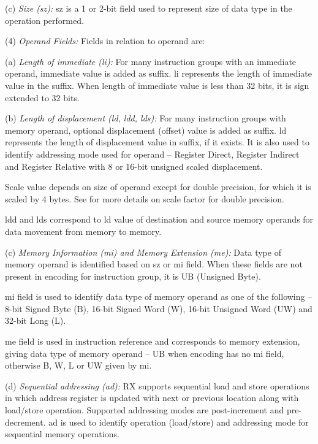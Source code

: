     (c) \emph{Size (sz):} %
    sz is a 1 or 2-bit field used to represent size of data type in the operation performed. 

\levelone    
(4) \emph{Operand Fields:} %
Fields in relation to operand are:

    \leveltwo
    (a) \emph{Length of immediate (li):} %
    For many instruction groups with an immediate operand, immediate value is added as suffix. li 
    represents the length of immediate value in the suffix. When length of immediate value is less 
    than 32 bits, it is sign extended to 32 bits.

    (b) \emph{Length of displacement (ld, ldd, lds):} %
    For many instruction groups with memory operand, optional displacement (offset) value is added as 
    suffix. ld represents the length of displacement value in suffix, if it exists. It is also used 
    to identify addressing mode used for operand -- Register Direct, Register Indirect and Register
    Relative with 8 or 16-bit unsigned scaled displacement. 
    
    Scale value depends on size of operand except for double precision, for which it is scaled by 
    4 bytes. See  for more details on scale 
    factor for double precision.

    ldd and lds correspond to ld value of destination and source memory operands for data movement 
    from memory to memory.

    (c) \emph{Memory Information (mi) and Memory Extension (me):} %
    Data type of memory operand is identified based on sz or mi field. When these fields are not 
    present in encoding for instruction group, it is UB (Unsigned Byte).

    mi field is used to identify data type of memory operand as one of the following -- 8-bit 
    Signed Byte (B), 16-bit Signed Word (W), 16-bit Unsigned Word (UW) and 32-bit Long (L).

    me field is used in instruction reference and corresponds to memory extension, giving data 
    type of memory operand -- UB when encoding has no mi field, otherwise B, W, L or UW given 
    by mi.

    (d) \emph{Sequential addressing (ad):} %
    RX supports sequential load and store operations in which address register is updated with 
    next or previous location along with load/store operation. Supported addressing modes are 
    post-increment and pre-decrement. ad is used to identify operation (load/store) and addressing
    mode for sequential memory operations.

